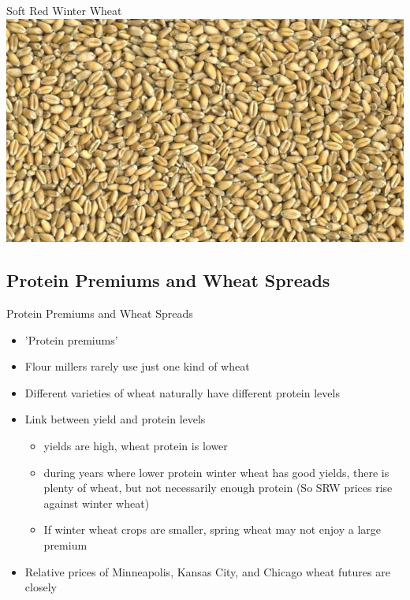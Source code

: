 \documentclass{beamer}
\begin{document}
\begin{frame}{Soft Red Winter Wheat}
\includegraphics[width=.75\textwidth]{SRW-Wheat.jpg}
\end{frame}

\subsection{Protein Premiums and Wheat Spreads}

\begin{frame}[<+-| alert@+>]{Protein Premiums and Wheat Spreads}
\begin{itemize}
\item 'Protein premiums'
\item Flour millers rarely use just one kind of wheat
\item Different varieties of wheat naturally have different protein levels
\item Link between yield and protein levels
\begin{itemize}
\item yields are high, wheat protein is lower
\item during years where lower protein winter wheat has good yields, there is plenty of wheat, but not necessarily enough protein (So SRW prices rise against winter wheat)
\item If winter wheat crops are smaller, spring wheat may not enjoy a large premium 
\end{itemize}
\item Relative prices of Minneapolis, Kansas City, and Chicago wheat futures are closely
\end{itemize}
\end{frame}
\end{document}
